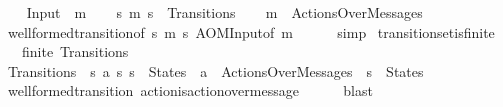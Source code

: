\begin{isabellebody}
\isanewline
\ \ \isamarkupfalse%
\ {\isacharparenleft}{\kern0pt}Input\ \ m{\isacharparenright}{\kern0pt}\isanewline
\ \ \isamarkupfalse%
\ {\isachardoublequoteopen}{\isacharparenleft}{\kern0pt}s{}{\isacharcomma}{\kern0pt}\ {\isacharquery}{\kern0pt}{\isasymlangle}m{\isasymrangle}{\isacharcomma}{\kern0pt}\ s{}{\isacharparenright}{\kern0pt}\ {\isasymin}\ Transitions{\isachardoublequoteclose}\isanewline
\ \ \isamarkupfalse%
\ {\isachardoublequoteopen}{\isacharquery}{\kern0pt}{\isasymlangle}m{\isasymrangle}\ {\isasymin}\ ActionsOverMessages{\isachardoublequoteclose}\isanewline
\ \ \ \ \isamarkupfalse%
\ well{\isacharunderscore}{\kern0pt}formed{\isacharunderscore}{\kern0pt}transition{\isacharbrackleft}{\kern0pt}of\ s{}\ {\isachardoublequoteopen}{\isacharquery}{\kern0pt}{\isasymlangle}m{\isasymrangle}{\isachardoublequoteclose}\ s{}{\isacharbrackright}{\kern0pt}\ AOMInput{\isacharbrackleft}{\kern0pt}of\ m{\isacharbrackright}{\kern0pt}\isanewline
\ \ \ \ \isamarkupfalse%
\ simp\isanewline
{}\isamarkupfalse%
%
\endisatagproof
{\isafoldproof}%
%
\isadelimproof
\isanewline
%
\endisadelimproof
\isanewline
{}\isamarkupfalse%
\ transition{\isacharunderscore}{\kern0pt}set{\isacharunderscore}{\kern0pt}is{\isacharunderscore}{\kern0pt}finite{\isacharcolon}{\kern0pt}\isanewline
\ \ \ {\isachardoublequoteopen}finite\ Transitions{\isachardoublequoteclose}\isanewline
%
\isadelimproof
%
\endisadelimproof
%
\isatagproof
{}\isamarkupfalse%
\ {\isacharminus}{\kern0pt}\isanewline
\ \ \isamarkupfalse%
\ {\isachardoublequoteopen}Transitions\ {\isasymsubseteq}\ {\isacharbraceleft}{\kern0pt}{\isacharparenleft}{\kern0pt}s{}{\isacharcomma}{\kern0pt}\ a{\isacharcomma}{\kern0pt}\ s{}{\isacharparenright}{\kern0pt}{\isachardot}{\kern0pt}\ s{}\ {\isasymin}\ States\ {\isasymand}\ a\ {\isasymin}\ ActionsOverMessages\ {\isasymand}\ s{}\ {\isasymin}\ States{\isacharbraceright}{\kern0pt}{\isachardoublequoteclose}\isanewline
\ \ \ \ \isamarkupfalse%
\ well{\isacharunderscore}{\kern0pt}formed{\isacharunderscore}{\kern0pt}transition\ action{\isacharunderscore}{\kern0pt}is{\isacharunderscore}{\kern0pt}action{\isacharunderscore}{\kern0pt}over{\isacharunderscore}{\kern0pt}message\isanewline
\ \ \ \ \isamarkupfalse%
\ blast\isanewline
\ \ \isamarkupfalse%

\end{isabellebody}
